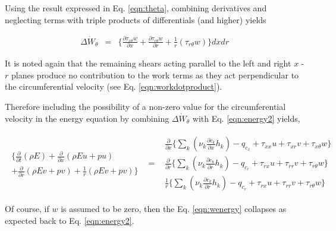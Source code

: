 	Using the result expressed in Eq. \ref{eqn:theta}, combining derivatives and neglecting terms with triple 
products of differentials (and higher) yields

\begin{displaymath}
	\begin{array}{ccc}
		\Delta \dot{W}_\theta & = & \Big\{
		\frac{\partial \tau_{x \theta}w}{\partial x} + \frac{\partial \tau_{r \theta}w}{\partial r}
		+ \frac{1}{r}(\tau_{r \theta}w)\Big\}dxdr
	\end{array}
\end{displaymath}

	It is noted again that the remaining shears acting parallel to the left and right $x$ - $r$ planes
produce no contribution to the work terms as they act perpendicular to the circumferential velocity (see 
Eq. \ref{eqn:workdotproduct}).

	Therefore including the possibility of a non-zero value for the circumferential velocity in the 
energy equation by combining $\Delta \dot{W}_\theta$ with Eq. \ref{eqn:energy2} yields,

\begin{equation}
	\begin{array}{ccc}
		\begin{array}{c}
		\Big\{\frac{\partial}{\partial t}(\rho E) +\frac{\partial}{\partial x}(\rho E u + pu) \\
		+ \frac{\partial}{\partial r}(\rho E v + pv) + \frac{1}{r}(\rho E v + pv)\Big\}
		\end{array} & = &
		\begin{array}{c}
			\frac{\partial}{\partial x}\Big\{
			\sum_k (\nu_k \frac{\partial c_k}{\partial x}h_k) 
			- q_{c_x} +  \tau_{xx}u + \tau_{xr}v + \tau_{x\theta}w\Big\} \\
			\frac{\partial}{\partial r}\Big\{
			\sum_k (\nu_k \frac{\partial c_k}{\partial r}h_k)
			-  q_{c_r} + \tau_{rx}u + \tau_{rr}v  + \tau_{r\theta}w\Big\} \\
			\frac{1}{r}\Big\{\sum_k (\nu_k \frac{\partial c_k}{\partial r}h_k) - q_{c_r} + \tau_{rx}u 
			+ \tau_{rr}v + \tau_{r\theta}w\Big\}
		\end{array}  
	\end{array}
\label{eqn:wenergy}
\end{equation}

	Of course, if $w$ is assumed to be zero, then the Eq. \ref{eqn:wenergy} collapses as expected back
to Eq. \ref{eqn:energy2}.

